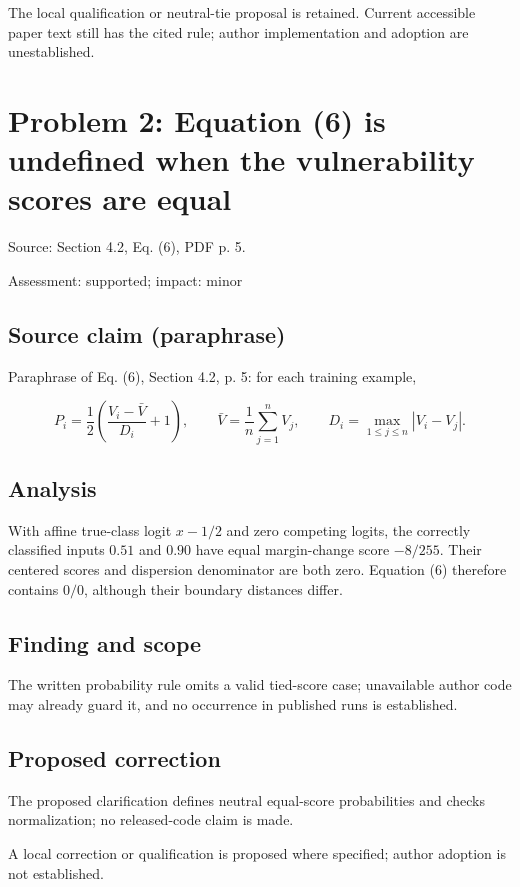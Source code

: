 \documentclass[11pt]{article}
\begin{document}
The local qualification or neutral-tie proposal is retained. Current accessible paper text still has the cited rule; author implementation and adoption are unestablished.

\section*{Problem 2: Equation (6) is undefined when the vulnerability scores are equal}

Source: Section 4.2, Eq. (6), PDF p. 5.

Assessment: supported; impact: minor

\subsection*{Source claim (paraphrase)}

Paraphrase of Eq. (6), Section 4.2, p. 5: for each training example,

\[ P_i=\frac12\left(\frac{V_i-\bar V}{D_i}+1\right),\qquad \bar V=\frac1n\sum_{j=1}^nV_j,\qquad D_i=\max_{1\le j\le n}|V_i-V_j|. \]

\subsection*{Analysis}

With affine true-class logit \(x-1/2\) and zero competing logits, the correctly classified inputs \(0.51\) and \(0.90\) have equal margin-change score \(-8/255\). Their centered scores and dispersion denominator are both zero. Equation (6) therefore contains \(0/0\), although their boundary distances differ.

\subsection*{Finding and scope}

The written probability rule omits a valid tied-score case; unavailable author code may already guard it, and no occurrence in published runs is established.

\subsection*{Proposed correction}

The proposed clarification defines neutral equal-score probabilities and checks normalization; no released-code claim is made.

A local correction or qualification is proposed where specified; author adoption is not established.
\end{document}
